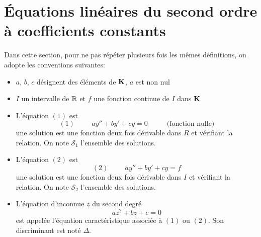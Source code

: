 \section{\'Equations linéaires du second ordre à coefficients constants}
Dans cette section, pour ne pas répéter plusieurs fois les mêmes définitions, on adopte les conventions suivantes:
\begin{itemize}
 \item $a$, $b$, $c$ désignent des éléments de $\mathbf{K}$, $a$ est non nul
 \item $I$ un intervalle de $\mathbb{R}$ et $f$ une fonction continue de $I$ dans $\mathbf{K}$
 \item L'équation $(1)$ est
\begin{displaymath}
 (1)\hspace{1cm} ay'' + by' + c y = 0 \hspace{1cm}\text{ (fonction nulle)}
\end{displaymath}
une solution est une fonction deux fois dérivable dans $R$ et vérifiant la relation. On note $\mathcal S_1$ l'ensemble des solutions.
 \item L'équation $(2)$ est
\begin{displaymath}
 (2)\hspace{1cm} ay'' + by' + c y = f 
\end{displaymath}
une solution est une fonction deux fois dérivable dans $I$ et vérifiant la relation.  On note $\mathcal S_2$ l'ensemble des solutions.
\item L'équation d'inconnue $z$ du second degré 
\begin{displaymath}
 az^2 + bz + c =0
\end{displaymath}
est appelée l'équation caractéristique associée à $(1)$ ou $(2)$. Son discriminant est noté $\Delta$.
\end{itemize}

